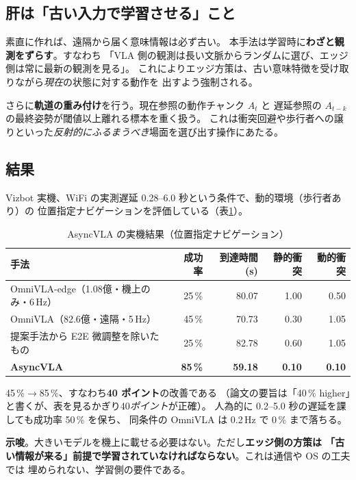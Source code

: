 \documentclass[11pt,a4paper]{article}
\newcommand{\prob}[1]{\textbf{\textcolor{red!55!black}{#1}}}
\newcommand{\keyp}[1]{\textbf{\textcolor{blue!45!black}{#1}}}
\begin{document}
\subsection*{肝は「古い入力で学習させる」こと}

素直に作れば、遠隔から届く意味情報は必ず古い。
本手法は学習時に\keyp{わざと観測をずらす}。すなわち
「VLA 側の観測は長い文脈からランダムに選び、エッジ側は常に最新の観測を見る」。
これによりエッジ方策は、古い意味特徴を受け取りながら\emph{現在}の状態に対する動作を
出すよう強制される。

さらに\keyp{軌道の重み付け}を行う。現在参照の動作チャンク $A_t$ と
遅延参照の $A_{t-k}$ の最終姿勢が閾値以上離れる標本を重く扱う。
これは衝突回避や歩行者への譲りといった\emph{反射的にふるまうべき}場面を選び出す操作にあたる。

\subsection*{結果}

Vizbot 実機、WiFi の実測遅延 0.28--6.0 秒という条件で、動的環境（歩行者あり）の
位置指定ナビゲーションを評価している（表\ref{tab:async}）。

\begin{table}[htbp]
\centering
\small
\caption{AsyncVLA の実機結果（位置指定ナビゲーション）}
\label{tab:async}
\begin{tabular}{@{}l r r r r@{}}
\toprule
\textbf{手法} & \textbf{成功率} & \textbf{到達時間(s)} & \textbf{静的衝突} & \textbf{動的衝突} \\
\midrule
OmniVLA-edge（1.08億・機上のみ・6\,Hz） & 25\,\% & 80.07 & 1.00 & 0.50 \\
OmniVLA（82.6億・遠隔・5\,Hz）          & 45\,\% & 70.73 & 0.30 & 1.05 \\
提案手法から E2E 微調整を除いたもの      & 25\,\% & 82.78 & 0.60 & 1.05 \\
\textbf{AsyncVLA} & \textbf{85\,\%} & \textbf{59.18} & \textbf{0.10} & \textbf{0.10} \\
\bottomrule
\end{tabular}
\end{table}

45\,\%$\to$85\,\%、すなわち\keyp{40 ポイント}の改善である
（論文の要旨は「40\,\% higher」と書くが、表を見るかぎり40\emph{ポイント}が正確）。
人為的に 0.2--5.0 秒の遅延を課しても成功率 50\,\% を保ち、
同条件の OmniVLA は 0.2\,Hz で 0\,\% まで落ちる。

\keyp{示唆}。大きいモデルを機上に載せる必要はない。ただし\prob{エッジ側の方策は
「古い情報が来る」前提で学習されていなければならない}。これは通信や OS の工夫では
埋められない、学習側の要件である。
\end{document}
